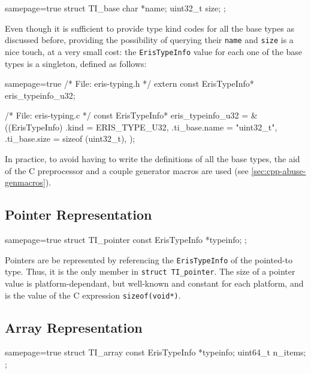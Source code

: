 \begin{ccode*}{samepage=true}
  struct TI_base {
    char               *name;
    uint32_t            size;
  };
\end{ccode*}

\noindent
Even though it is sufficient to provide type kind codes for all the base types
as discussed before, providing the possibility of querying their \verb|name|
and \verb|size| is a nice touch, at a very small cost: the \verb|ErisTypeInfo|
value for each one of the base types is a singleton, defined as follows:

\begin{ccode*}{samepage=true}
  /* File: eris-typing.h */
  extern const ErisTypeInfo* eris_typeinfo_u32;

  /* File: eris-typing.c */
  const ErisTypeInfo* eris_typeinfo_u32 = &((ErisTypeInfo) {
    .kind         = ERIS_TYPE_U32,
    .ti_base.name = "uint32_t",
    .ti_base.size = sizeof (uint32_t),
  });
\end{ccode*}

\noindent
In practice, to avoid having to write the definitions of all the base types,
the aid of the C preprocessor and a couple generator macros are used (see
\autoref{sec:cpp-abuse-genmacros}).


\subsection{Pointer Representation}
  \label{sec:pointer-typeinfo}

\begin{ccode*}{samepage=true}
  struct TI_pointer {
    const ErisTypeInfo *typeinfo;
  };
\end{ccode*}

\noindent
Pointers are be represented by referencing the \verb|ErisTypeInfo| of the
pointed-to type. Thus, it is the only member in \texttt{struct
TI_pointer}. The size of a pointer value is platform-dependant, but well-known
and constant for each platform, and is the value of the C expression
\texttt{sizeof(void*)}.


\subsection{Array Representation}

\begin{ccode*}{samepage=true}
  struct TI_array {
    const ErisTypeInfo *typeinfo;
    uint64_t            n_items;
  };
\end{ccode*}

